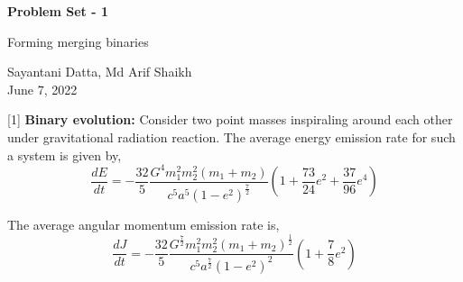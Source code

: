 \documentclass{article} %
\newcommand{\question}[2][]{\begin{flushleft}
        \textbf{Problem #1}: %
\end{flushleft}
}
\newcommand{\maketitletwo}[2][]{\begin{center}
        \Large{\textbf{Problem Set - 1}
            
            Forming merging binaries} %
        \vspace{10pt}
        
        \normalsize{Sayantani Datta, Md Arif Shaikh  %
        } \\
        \vspace{5pt}  June 7, 2022     %
        \vspace{15pt}
        
\end{center}}
\begin{document}
    \maketitletwo[5]  %
    
    \question[1]{} \textbf{Binary evolution:} Consider two point masses inspiraling around each other under gravitational radiation reaction. The average energy emission rate for such a system is given by,
    \begin{equation}\label{energyloss}
\frac{dE}{dt} = -\frac{32}{5}\frac{G^4 m_1^2 m_2^2 (m_1+m_2)}{c^5 a^5(1-e^2)^{\frac{7}{2}}} \left( 1 + \frac{73}{24}e^2+\frac{37}{96}e^4\right)
    \end{equation}
    
    The average angular momentum emission rate is,
    \begin{equation}\label{momentumloss}
     \frac{dJ}{dt} = -\frac{32}{5}\frac{G^{\frac{7}{2}} m_1^2 m_2^2 (m_1+m_2)^{\frac{1}{2}}}{c^5 a^{\frac{7}{2}}(1-e^2)^2} \left( 1 + \frac{7}{8}e^2\right)
     \end{equation}
     
\end{document}
